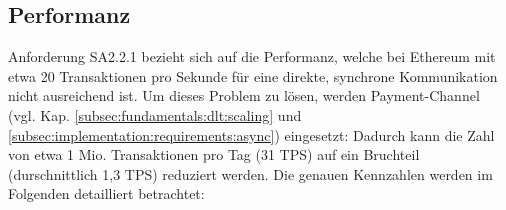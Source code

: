 \subsection{Performanz}
\label{subsec:implementation:requirements:performance}
Anforderung SA2.2.1 bezieht sich auf die Performanz, welche bei Ethereum mit etwa 20 Transaktionen pro Sekunde für eine direkte, synchrone Kommunikation nicht ausreichend ist. Um dieses Problem zu lösen, werden Payment-Channel (vgl. Kap. \ref{subsec:fundamentals:dlt:scaling} und \ref{subsec:implementation:requirements:async}) eingesetzt: Dadurch kann die Zahl von etwa 1 Mio. Transaktionen pro Tag (31 \ac{TPS}) auf ein Bruchteil (durschnittlich 1,3 \ac{TPS}) reduziert werden. Die genauen Kennzahlen werden im Folgenden detailliert betrachtet:\\


